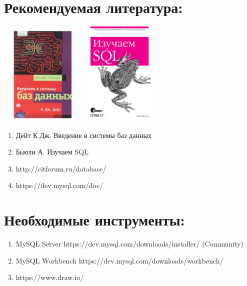 \documentclass[12pt,a4paper]{article}
\begin{document}
\section{Рекомендуемая литература:}
\includegraphics[width=4cm,height=5cm]{images/Overview/recommended_literature_book_01.jpg}
\includegraphics[width=4cm,height=5cm]{images/Overview/recommended_literature_book_02.jpg}
\begin{enumerate}
    \item Дейт К.Дж. Введение в системы баз данных
    \item Бьюли А. Изучаем SQL
    \item http://citforum.ru/database/
    \item https://dev.mysql.com/doc/
\end{enumerate}
\section{Необходимые инструменты:}
\begin{enumerate}
    \item MySQL Server https://dev.mysql.com/downloads/installer/ (Community)
    \item MySQL Workbench https://dev.mysql.com/downloads/workbench/
    \item https://www.draw.io/
\end{enumerate}
\end{document}
